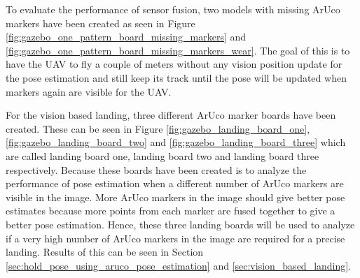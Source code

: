 \documentclass[../Head/report.tex]{subfiles}
\begin{document}
To evaluate the performance of sensor fusion, two models with missing ArUco markers have been created as seen in Figure \ref{fig:gazebo_one_pattern_board_missing_markers} and \ref{fig:gazebo_one_pattern_board_missing_markers_wear}. The goal of this is to have the UAV to fly a couple of meters without any vision position update for the pose estimation and still keep its track until the pose will be updated when markers again are visible for the UAV.

For the vision based landing, three different ArUco marker boards have been created. These can be seen in Figure \ref{fig:gazebo_landing_board_one}, \ref{fig:gazebo_landing_board_two} and \ref{fig:gazebo_landing_board_three} which are called landing board one, landing board two and landing board three respectively. Because these boards have been created is to analyze the performance of pose estimation when a different number of ArUco markers are visible in the image. More ArUco markers in the image should give better pose estimates because more points from each marker are fused together to give a better pose estimation. Hence, these three landing boards will be used to analyze if a very high number of ArUco markers in the image are required for a precise landing. Results of this can be seen in Section \ref{sec:hold_pose_using_aruco_pose_estimation} and \ref{sec:vision_based_landing}. 
\end{document}
